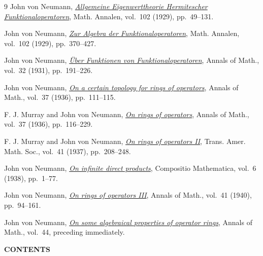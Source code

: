 \documentclass[b5paper,twoside]{article}
\makeatletter
\newcommand{\MvNSetCurrentLabel}[2]{%
  \edef\@currentlabel{#1}%
  \edef\@currentlabelname{#2}%
}
\newcommand{\MvNTargetLabel}[3]{%
  \phantomsection
  \begingroup
    \MvNSetCurrentLabel{#2}{#3}%
    \label{#1}%
  \endgroup
}
\theoremstyle{mvnplain}
\makeatother
\begin{document}
\renewcommand{\refname}{\centering\MakeUppercase{Bibliography}}
\begin{thebibliography}{9}
John von Neumann,
\href{https://doi.org/10.1007/BF01782338}{\emph{Allgemeine Eigenwerttheorie
Hermitescher Funktionaloperatoren}}, Math. Annalen, vol.~102 (1929),
pp.~49--131.

John von Neumann,
\href{https://doi.org/10.1007/BF01782352}{\emph{Zur Algebra der
Funktionaloperatoren}}, Math. Annalen, vol.~102 (1929), pp.~370--427.

John von Neumann,
\href{https://doi.org/10.2307/1968185}{\emph{\"Uber Funktionen von
Funktionaloperatoren}}, Annals of Math., vol.~32 (1931), pp.~191--226.

John von Neumann,
\href{https://doi.org/10.2307/1968692}{\emph{On a certain topology for rings
of operators}}, Annals of Math., vol.~37 (1936), pp.~111--115.

F. J. Murray and John von Neumann,
\href{https://doi.org/10.2307/1968693}{\emph{On rings of operators}}, Annals
of Math., vol.~37 (1936), pp.~116--229.

F. J. Murray and John von Neumann,
\href{https://doi.org/10.1090/S0002-9947-1937-1501899-4}{\emph{On rings of
operators II}}, Trans. Amer. Math. Soc., vol.~41 (1937), pp.~208--248.

John von Neumann,
\href{https://www.numdam.org/item/CM_1939__6__1_0/}{\emph{On infinite direct
products}}, Compositio Mathematica, vol.~6 (1938), pp.~1--77.

John von Neumann,
\href{https://doi.org/10.2307/1968823}{\emph{On rings of operators III}},
Annals of Math., vol.~41 (1940), pp.~94--161.

John von Neumann,
\href{https://doi.org/10.2307/1969106}{\emph{On some algebraical properties
of operator rings}}, Annals of Math., vol.~44, preceding immediately.
\end{thebibliography}

\MvNTargetLabel{contents}{Contents}{Contents}
\begin{center}\bfseries\MakeUppercase{Contents}\end{center}

\newcommand{\ContentsChapter}[2]{%
  \par\noindent\hyperref[#1]{\textbf{#2}}\par}
\newcommand{\ContentsSection}[3]{%
  \par\hangindent=2.8em\hangafter=1\noindent\hspace*{1.5em}%
  \hyperref[#1]{\S#2\quad #3}\par}
\newcommand{\ContentsStatement}[3]{%
  \par\hangindent=4.7em\hangafter=1\noindent\hspace*{3.3em}%
  \hyperref[#1]{#2.\quad #3}\par}
\end{document}
